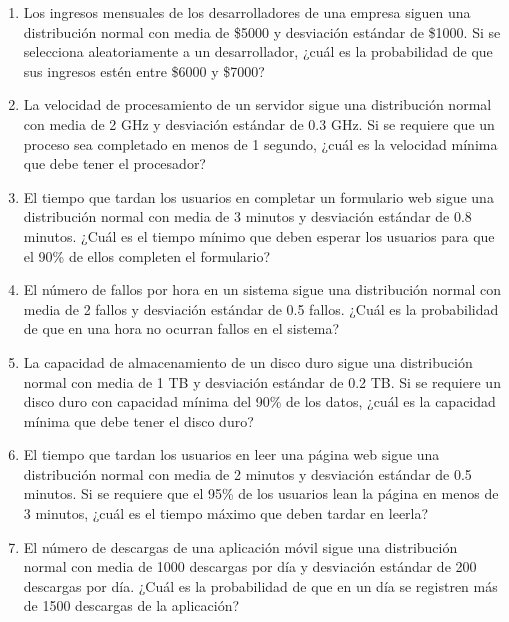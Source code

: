 \begin{Ejer}
\begin{enumerate}
    \item Los ingresos mensuales de los desarrolladores de una empresa siguen una distribución normal con media de \$5000 y desviación estándar de \$1000. Si se selecciona aleatoriamente a un desarrollador, ¿cuál es la probabilidad de que sus ingresos estén entre \$6000 y \$7000?

    \item La velocidad de procesamiento de un servidor sigue una distribución normal con media de 2 GHz y desviación estándar de 0.3 GHz. Si se requiere que un proceso sea completado en menos de 1 segundo, ¿cuál es la velocidad mínima que debe tener el procesador?

    \item El tiempo que tardan los usuarios en completar un formulario web sigue una distribución normal con media de 3 minutos y desviación estándar de 0.8 minutos. ¿Cuál es el tiempo mínimo que deben esperar los usuarios para que el 90\% de ellos completen el formulario?

    \item El número de fallos por hora en un sistema sigue una distribución normal con media de 2 fallos y desviación estándar de 0.5 fallos. ¿Cuál es la probabilidad de que en una hora no ocurran fallos en el sistema?

    \item La capacidad de almacenamiento de un disco duro sigue una distribución normal con media de 1 TB y desviación estándar de 0.2 TB. Si se requiere un disco duro con capacidad mínima del 90\% de los datos, ¿cuál es la capacidad mínima que debe tener el disco duro?

    \item El tiempo que tardan los usuarios en leer una página web sigue una distribución normal con media de 2 minutos y desviación estándar de 0.5 minutos. Si se requiere que el 95\% de los usuarios lean la página en menos de 3 minutos, ¿cuál es el tiempo máximo que deben tardar en leerla?

    \item El número de descargas de una aplicación móvil sigue una distribución normal con media de 1000 descargas por día y desviación estándar de 200 descargas por día. ¿Cuál es la probabilidad de que en un día se registren más de 1500 descargas de la aplicación?

\end{enumerate}
\end{Ejer} 


